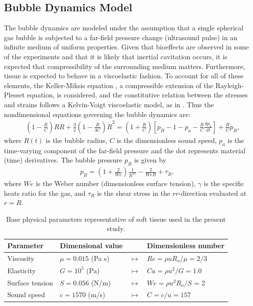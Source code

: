 \subsection{Bubble Dynamics Model}%
\label{subsec:usbe_bubble_model}%
The bubble dynamics are modeled under the assumption that a single
spherical gas bubble is subjected to a far-field pressure change
(ultrasound pulse) in an infinite medium of uniform properties.  Given
that bioeffects are observed in some of the experiments and that it is
likely that inertial cavitation occurs, it is expected that
compressibility of the surrounding medium matters. Furthermore, tissue
is expected to behave in a viscoelastic fashion. To account for all of
these elements, the Keller-Miksis equation \cite[]{keller1980}, a
compressible extension of the Rayleigh-Plesset equation, is
considered, and the constitutive relation between the stresses and
strains follows a Kelvin-Voigt viscoelastic model, as in
\cite{Yang2005}. Thus the nondimensional equations governing the
bubble dynamics are:
\begin{eqnarray}\label{eq:keller}
  &&\left(1-\frac{\dot{R}}{C}\right) R \ddot{R} +
    \frac{3}{2}\left(1-\frac{\dot{R}}{3 C}\right) \dot{R}^2 \nonumber  %
     = \left(1+\frac{\dot{R}}{C}\right) \left[p_B- 1 -p_a -
    \frac{R}{C}\frac{dp_a}{dt}\right] +\frac{R}{C} \dot{p}_B,
\end{eqnarray}
where $R(t)$ is the bubble radius, $C$ is the dimensionless sound
speed, $p_a$ is the time-varying component of the far-field pressure
and the dot represents material (time) derivatives. The bubble
pressure $p_B$ is given by
\begin{align}\label{eq:bubble_pressure}
  p_B = \left(1+\frac{2}{We}\right)\frac{1}{R^{3\gamma}}-\frac{2}{We R} + \tau_R,
\end{align}
where $We$ is the Weber number (dimensionless surface tension),
$\gamma$ is the specific heats ratio for the gas, and $\tau_R$ is the
shear stress in the $rr$-direction evaluated at $r=R$.

\begin{table}[!t]
  \centering
  \begin{tabular}{l l c l}
    Parameter & Dimensional value & & Dimensionless number \\ \hline
    Viscosity & $\mu=0.015$ (Pa s) & $\mapsto$ & $Re=\rho u R_o / \mu = 2/3$ \\
    Elasticity & $G=10^5$ (Pa) & $\mapsto$ & $Ca= \rho u^2 / G = 1.0$ 	\\
    Surface tension & $S=0.056$ (N/m) & $\mapsto$ & $We=\rho u^2 R_o / S$ = 2 \\
    Sound speed & $c=1570$ (m/s) & $\mapsto$ & $C = c/u=157$ \\  
  \end{tabular} 
  \caption{Base physical parameters representative of soft tissue used
    in the present study.}
  \label{tab:usbe_bubble_parameters}
\end{table}



